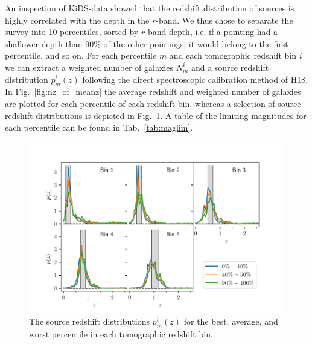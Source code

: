 \documentclass{aa}
\begin{document}
An inspection of KiDS-data showed that the redshift distribution of sources is highly correlated with the depth in the $r$-band. We thus chose to separate the survey into 10 percentiles, sorted by $r$-band depth, i.e. if a pointing had a shallower depth than 90\% of the other pointings, it would belong to the first percentile, and so on. For each percentile $m$ and each tomographic redshift bin $i$ we can extract a weighted number of galaxies $N^i_m$ and a source redshift distribution $p^i_m(z)$ following the direct spectroscopic calibration method of H18. In Fig.~\ref{fig:nz_of_meanz} the average redshift and weighted number of galaxies are plotted for each percentile of each redshift bin, whereas a selection of source redshift distributions is depicted in Fig.~\ref{fig:nofz_percentiles}. A table of the limiting magnitudes for each percentile can be found in Tab.~\ref{tab:maglim}.
%
\begin{figure}
\centering
\includegraphics[trim = {1cm 0 1.2cm 0.1cm}, clip, width=\linewidth]{images/dist_z_all.pdf}
\caption{The source redshift distributions $p^i_m(z)$ for the best, average, and worst percentile in each tomographic redshift bin.}
\label{fig:nofz_percentiles}
\end{figure}
\end{document}
